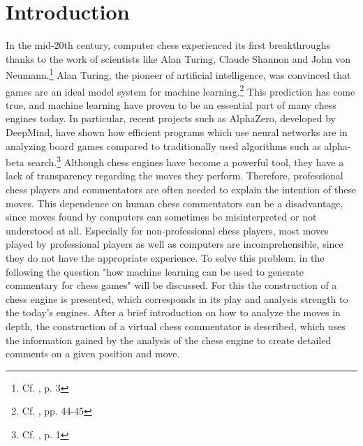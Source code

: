 \section{Introduction}

In the mid-20th century, computer chess experienced its first breakthroughs thanks to the work of scientists like Alan Turing, Claude Shannon and John von Neumann.\footnote{Cf. \cite{keen-2009-history}, p. 3} Alan Turing, the pioneer of artificial intelligence, was convinced that games are an ideal model system for machine learning.\footnote{Cf. \cite{levy-newborn-1982}, pp. 44-45} This prediction has come true, and machine learning have proven to be an essential part of many chess engines today. In particular, recent projects such as AlphaZero, developed by DeepMind, have shown how efficient programs which use neural networks are in analyzing board games compared to traditionally used algorithms such as alpha-beta search.\footnote{Cf. \cite{alphazero-2018}, p. 1} Although chess engines have become a powerful tool, they have a lack of transparency regarding the moves they perform. Therefore, professional chess players and commentators are often needed to explain the intention of these moves. This dependence on human chess commentators can be a disadvantage, since moves found by computers can sometimes be misinterpreted or not understood at all. Especially for non-professional chess players, most moves played by professional players as well as computers are incomprehensible, since they do not have the appropriate experience. To solve this problem, in the following the question "how machine learning can be used to generate commentary for chess games" will be discussed. For this the construction of a chess engine is presented, which corresponds in its play and analysis strength to the today's engines. After a brief introduction on how to analyze the moves in depth, the construction of a virtual chess commentator is described, which uses the information gained by the analysis of the chess engine to create detailed comments on a given position and move.